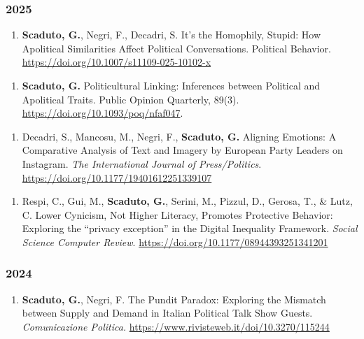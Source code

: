 \documentclass[10pt,]{article}
\providecommand{\tightlist}{%
  \setlength{\itemsep}{0pt}\setlength{\parskip}{0pt}}
\begin{document}
\subsubsection{2025}\label{section}

\begin{enumerate}
\def\labelenumi{\arabic{enumi}.}
\setcounter{enumi}{9}
\tightlist
\item
  \textbf{Scaduto, G.}, Negri, F., Decadri, S. It's the Homophily,
  Stupid: How Apolitical Similarities Affect Political Conversations.
  Political Behavior. \url{https://doi.org/10.1007/s11109-025-10102-x}
\end{enumerate}

\begin{enumerate}
\def\labelenumi{\arabic{enumi}.}
\setcounter{enumi}{8}
\tightlist
\item
  \textbf{Scaduto, G.} Politicultural Linking: Inferences between
  Political and Apolitical Traits. Public Opinion Quarterly, 89(3).
  \url{https://doi.org/10.1093/poq/nfaf047}.
\end{enumerate}

\begin{enumerate}
\def\labelenumi{\arabic{enumi}.}
\setcounter{enumi}{7}
\tightlist
\item
  Decadri, S., Mancosu, M., Negri, F., \textbf{Scaduto, G.} Aligning
  Emotions: A Comparative Analysis of Text and Imagery by European Party
  Leaders on Instagram. \emph{The International Journal of
  Press/Politics}. \url{https://doi.org/10.1177/19401612251339107}
\end{enumerate}

\begin{enumerate}
\def\labelenumi{\arabic{enumi}.}
\setcounter{enumi}{6}
\tightlist
\item
  Respi, C., Gui, M., \textbf{Scaduto, G.}, Serini, M., Pizzul, D.,
  Gerosa, T., \& Lutz, C. Lower Cynicism, Not Higher Literacy, Promotes
  Protective Behavior: Exploring the ``privacy exception'' in the
  Digital Inequality Framework. \emph{Social Science Computer Review}.
  \url{https://doi.org/10.1177/08944393251341201}
\end{enumerate}

\subsubsection{2024}\label{section-1}

\begin{enumerate}
\def\labelenumi{\arabic{enumi}.}
\setcounter{enumi}{5}
\tightlist
\item
  \textbf{Scaduto, G.}, Negri, F. The Pundit Paradox: Exploring the
  Mismatch between Supply and Demand in Italian Political Talk Show
  Guests. \emph{Comunicazione Politica.}
  \url{https://www.rivisteweb.it/doi/10.3270/115244}
\end{enumerate}
\end{document}
